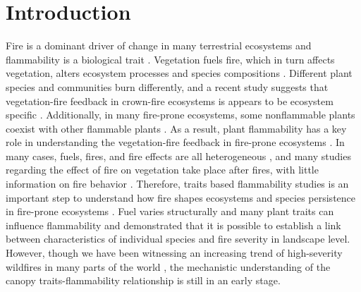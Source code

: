 \documentclass[12pt]{report}
\begin{document}
\section{Introduction}

Fire is a dominant driver of change in many terrestrial ecosystems and flammability is a biological trait \citep{pausas2012flammability}. Vegetation fuels fire, which in turn affects vegetation, \citep{bar2019fire} alters ecosystem processes \citep{debano1978effect, debano1998fire, grogan2000fire,wan2001fire, keane2008ecological, roces2022global,ojima1994long} and species compositions \citep{cochrane2003fire,cleary2004changes, laurance2003slow}. Different plant species and communities burn differently, and a recent study  suggests that vegetation-fire feedback in crown-fire ecosystems is appears to be ecosystem specific \citep{pausas2004plant}. Additionally, in many fire-prone ecosystems, some nonflammable plants coexist with other flammable plants \citep{pausas2012fire, pausas2017flammability}. As a result, plant flammability has a key role in understanding the vegetation-fire feedback in fire-prone ecosystems \citep{pausas2012fire, pausas2017flammability}. In many cases, fuels, fires, and fire effects are all heterogeneous \citep{gagnon2010does}, and many studies regarding the effect of fire on vegetation take place after fires, with little information on fire behavior \citep{o2018advances}. Therefore, traits based flammability studies is an important step to understand how fire shapes ecosystems and species persistence in fire-prone ecosystems \citep{pausas2012fire, pausas2017flammability}. Fuel varies structurally and many plant traits can influence flammability and \citep{schwilk2011scaling} demonstrated that it is possible to establish a link between characteristics of individual species  and fire severity in landscape level. However, though we have been witnessing an increasing trend of high-severity wildfires in many parts of the world \citep{miller2012trends, dennison2014large, weber2020spatiotemporal, salguero2020wildfire}, the mechanistic understanding of the canopy traits-flammability relationship is  still in an early stage.\\
\end{document}
